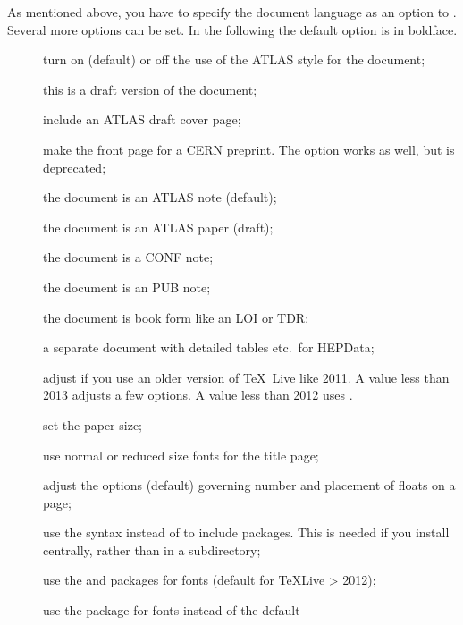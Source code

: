 As mentioned above, you have to specify the document language as an option to .
Several more options can be set.
In the following the default option is in boldface.
\begin{description}
\item[] turn on (default) or off the use of the ATLAS style for the document;
\item[] this is a draft version of the document;
\item[] include an ATLAS draft cover page;
\item[] make the front page for a CERN preprint.
  The option  works as well, but is deprecated;
\item[] the document is an ATLAS note (default);
\item[] the document is an ATLAS paper (draft);
\item[] the document is a CONF note;
\item[] the document is an PUB note;
\item[] the document is book form like an LOI or TDR;
\item[] a separate document with detailed tables etc.\ for HEPData;
\item[] adjust if you use an older version of \TeX\ Live like 2011.
  A value less than 2013 adjusts a few  options.
  A value less than 2012 uses .
\item[] set the paper size;
\item[] use normal or reduced size fonts for the title page;
\item[] adjust the options (default) governing number and placement of floats on a page;
\item[] use the syntax 
  instead of  to include packages.
  This is needed if you install  centrally,
  rather than in a  subdirectory;
\item[] use the  and  packages for fonts 
  (default for \TeX Live > 2012);
\item[] use the  package for fonts instead of the default

\end{description}
